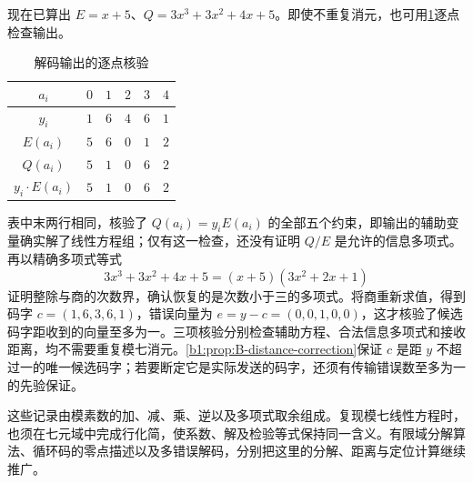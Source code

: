 \ProseParagraphBreak
现在已算出 \(E=x+5\)、\(Q=3x^3+3x^2+4x+5\)。即使不重复消元，也可用\cref{b1:tab:B-RS-point-check}逐点检查输出。

\begin{table}[htbp]
	\centering
	\caption{解码输出的逐点核验}
	\label{b1:tab:B-RS-point-check}
	\begin{tabular}{@{}c ccccc@{}}
		\toprule
		\(a_i\) & \(0\) & \(1\) & \(2\) & \(3\) & \(4\) \\
		\midrule
		\(y_i\) & \(1\) & \(6\) & \(4\) & \(6\) & \(1\) \\
		\(E(a_i)\) & \(5\) & \(6\) & \(0\) & \(1\) & \(2\) \\
		\(Q(a_i)\) & \(5\) & \(1\) & \(0\) & \(6\) & \(2\) \\
		\(y_i\cdot E(a_i)\) & \(5\) & \(1\) & \(0\) & \(6\) & \(2\) \\
		\bottomrule
	\end{tabular}
\end{table}

表中末两行相同，核验了 \(Q(a_i)=y_iE(a_i)\) 的全部五个约束，即输出的辅助变量确实解了线性方程组；仅有这一检查，还没有证明 \(Q/E\) 是允许的信息多项式。再以精确多项式等式
\[
	3x^3+3x^2+4x+5=(x+5)(3x^2+2x+1)
\]
证明整除与商的次数界，确认恢复的是次数小于三的多项式。将商重新求值，得到码字 \(c=(1,6,3,6,1)\)，错误向量为 \(e=y-c=(0,0,1,0,0)\)，这才核验了候选码字距收到的向量至多为一。三项核验分别检查辅助方程、合法信息多项式和接收距离，均不需要重复模七消元。\cref{b1:prop:B-distance-correction}保证 \(c\) 是距 \(y\) 不超过一的唯一候选码字；若要断定它是实际发送的码字，还须有传输错误数至多为一的先验保证。

\ProseParagraphBreak
这些记录由模素数的加、减、乘、逆以及多项式取余组成。复现模七线性方程时，也须在七元域中完成行化简，使系数、解及检验等式保持同一含义。有限域分解算法、循环码的零点描述以及多错误解码，分别把这里的分解、距离与定位计算继续推广。

